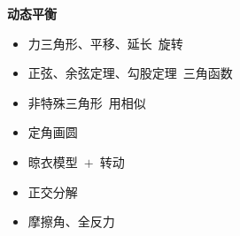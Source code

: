 \textbf{动态平衡}
\begin{itemize}
\item 力三角形、平移、延长\ 旋转
\item 正弦、余弦定理、勾股定理\ 三角函数
\item 非特殊三角形\ 用相似
\item 定角画圆
\item 晾衣模型\ $+$\ 转动 %
\item 正交分解
\item 摩擦角、全反力
\end{itemize}

